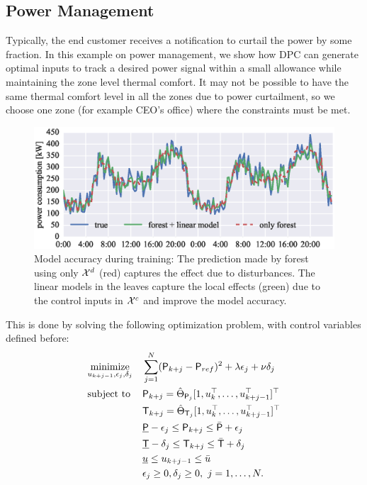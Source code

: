 \subsection{Power Management}
\label{SS:powermanagement}
Typically, the end customer receives a notification to curtail the power by some fraction. 
In this example on power management, we show how DPC can generate optimal inputs to track a desired power signal within a small allowance while maintaining the zone level thermal comfort. It may not be possible to have the same thermal comfort level in all the zones due to power curtailment, so we choose one zone (for example CEO's office) where the constraints must be met.
\begin{figure}[t!]
	\centering
	\includegraphics[width=30pc]{figures/eplus_validation.eps}	
	\caption{Model accuracy during training: The prediction made by forest using only $\mathcal{X}^d$ (red) captures the effect due to disturbances. The linear models in the leaves capture the local effects (green) due to the control inputs in $\mathcal{X}^c$ and improve the model accuracy.}
	\label{F:sepvars}
	\captionsetup{justification=centering}
\end{figure}
This is done by solving the following optimization problem, with control variables defined before:
\begin{align}
\begin{aligned}
& \underset{u_{k+j-1},\epsilon_j,\delta_j}{\mathrm{minimize}} & & \sum_{j=1}^{N} ({\mathsf{P}}_{k+j} - \mathsf{P}_{ref})^2 +  \lambda\epsilon_j + \nu \delta_j \\
& \mathrm{subject\ to }                                       & & \mathsf{P}_{k+j} =  \hat{\Theta}_{\mathsf{P}_j} [ 1,u^\top_{k},\ldots,u^\top_{k+j-1} ]^\top  \\
&                                                             & & \mathsf{T}_{k+j} =  \hat{\Theta}_{\mathsf{T}_j} [ 1,u^\top_{k},\ldots,u^\top_{k+j-1} ]^\top  \\
&                                                             & & \underline{\mathsf{P}} - \epsilon_j \leq \mathsf{P}_{k+j} \leq \bar{\mathsf{P}} + \epsilon_j        \\
&                                                             & & \underline{\mathsf{T}} - \delta_j   \leq \mathsf{T}_{k+j} \leq \bar{\mathsf{T}} + \delta_j          \\
&                                                             & & \underline{u}                \leq u_{k+j-1} \leq \bar{u}                       \\
&                                                             & & \epsilon_j \geq 0,\delta_j \geq 0, \ j = 1,\dots,N.
\end{aligned}\label{E:ptrack}
\end{align}

